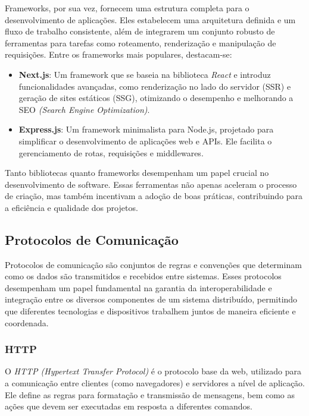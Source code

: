 Frameworks, por sua vez, fornecem uma estrutura completa para o desenvolvimento de aplicações. Eles estabelecem uma arquitetura definida e um fluxo de trabalho consistente, além de integrarem um conjunto robusto de ferramentas para tarefas como roteamento, renderização e manipulação de requisições. Entre os frameworks mais populares, destacam-se:
\begin{itemize}
    \item \textbf{Next.js}: Um framework que se baseia na biblioteca \emph{React}\cite{what-is-nextjs} e introduz funcionalidades avançadas, como renderização no lado do servidor (SSR) e geração de sites estáticos (SSG), otimizando o desempenho e melhorando a SEO \emph{(Search Engine Optimization)}.
    \item \textbf{Express.js}: Um framework minimalista para Node.js, projetado para simplificar o desenvolvimento de aplicações web e APIs. Ele facilita o gerenciamento de rotas, requisições e middlewares.
\end{itemize}

Tanto bibliotecas quanto frameworks desempenham um papel crucial no desenvolvimento de software. Essas ferramentas não apenas aceleram o processo de criação, mas também incentivam a adoção de boas práticas, contribuindo para a eficiência e qualidade dos projetos.


\subsection{Protocolos de Comunicação}

Protocolos de comunicação são conjuntos de regras e convenções que determinam como os dados são transmitidos e recebidos entre sistemas. Esses protocolos desempenham um papel fundamental na garantia da interoperabilidade e integração entre os diversos componentes de um sistema distribuído, permitindo que diferentes tecnologias e dispositivos trabalhem juntos de maneira eficiente e coordenada.

\subsubsection{HTTP}

O \emph{HTTP (Hypertext Transfer Protocol)} é o protocolo base da web, utilizado para a comunicação entre clientes (como navegadores) e servidores a nível de aplicação\cite{http-protocol}. Ele define as regras para formatação e transmissão de mensagens, bem como as ações que devem ser executadas em resposta a diferentes comandos.

